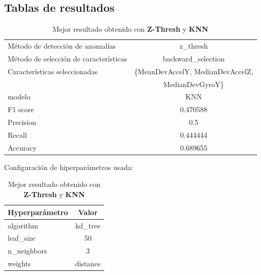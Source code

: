 \begin{appendices}
	\newpage
	\section*{Tablas de resultados}
		
		\begin{table}[htb]
			\centering
			\caption{Mejor resultado obtenido con \textbf{Z-Thresh} y \textbf{KNN}}
			\label{table:17}
			\begin{tabular}{lc}
				\toprule
				\midrule
					  Método de detección de anomalías &                                         z\_thresh \\
				Método de selección de características &                               backward\_selection \\
						 Características seleccionadas & \{MeanDevAccelY, MedianDevAccelZ,    \\
						 							   &									MedianDevGyroY\} \\
												modelo &                                              KNN \\
											  F1 score &                                         0.470588 \\
											 Precision &                                              0.5 \\
												Recall &                                         0.444444 \\
											  Accuracy &                                         0.689655 \\
				\bottomrule
			\end{tabular}
			\newline
			\newline
			Configuración de hiperparámetros usada:
				\begin{tabular}{lc}
				\toprule
				Hyperparámetro &    Valor \\
				\midrule
					 algorithm &  kd\_tree \\
					 leaf\_size &       50 \\
				   n\_neighbors &        3 \\
					   weights & distance \\
				\bottomrule
				\end{tabular}
			
			
		\end{table}


\end{appendices}
